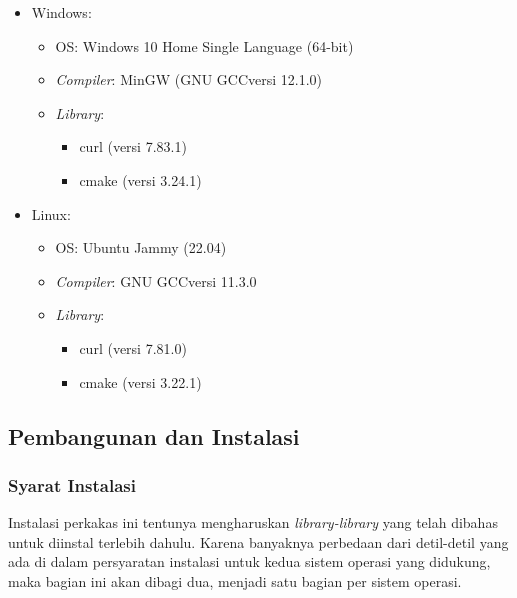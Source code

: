 \begin{itemize}
	\item Windows:
	
	\begin{itemize}
		\item OS: Windows 10 Home Single Language (64-bit)
		\item \textit{Compiler}: MinGW (GNU GCC\textemdash versi 12.1.0)
		\item \textit{Library}:
		
		\begin{itemize}
			\item curl (versi 7.83.1)
			\item cmake (versi 3.24.1)
		\end{itemize}
		
	\end{itemize}
	
	\item Linux:
	
	\begin{itemize}
		\item OS: Ubuntu Jammy (22.04)
		\item \textit{Compiler}: GNU GCC\textemdash versi 11.3.0
		\item \textit{Library}:
		
		\begin{itemize}
			\item curl (versi 7.81.0)
			\item cmake (versi 3.22.1)
		\end{itemize}
		
	\end{itemize}
	
\end{itemize}

\subsection{Pembangunan dan Instalasi}
\label{sec:testing-experiments-installation}

\subsubsection{Syarat Instalasi}
\label{sec:testing-experiments-installation-requirements}

Instalasi perkakas ini tentunya mengharuskan \textit{library-library} yang telah dibahas untuk diinstal terlebih dahulu. Karena banyaknya perbedaan dari detil-detil yang ada di dalam persyaratan instalasi untuk kedua sistem operasi yang didukung, maka bagian ini akan dibagi dua, menjadi satu bagian per sistem operasi.

